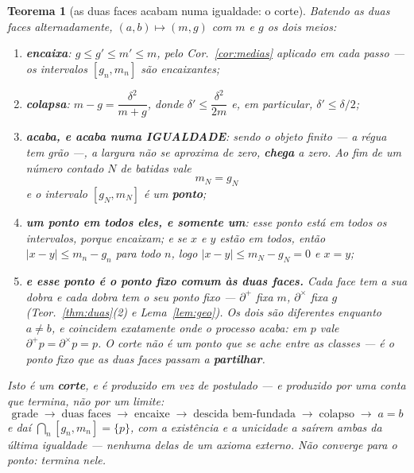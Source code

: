 \documentclass[11pt,a4paper]{article}
\newtheorem{teorema}{Teorema}
\begin{document}
\begin{teorema}[as duas faces acabam numa igualdade: o corte]\label{thm:corte}
Batendo as duas faces alternadamente, $(a,b)\mapsto(m,g)$ com $m$ e $g$ os dois
meios:
\begin{enumerate}\itemsep3pt
\item[(1)] \textbf{encaixa}: $g\le g'\le m'\le m$, pelo Cor.~\ref{cor:medias}
aplicado em cada passo --- os intervalos $[g_{n},m_{n}]$ são encaixantes;
\item[(2)] \textbf{colapsa}: $m-g=\dfrac{\delta^{2}}{m+g}$, donde
$\delta'\le\dfrac{\delta^{2}}{2m}$ e, em particular, $\delta'\le\delta/2$;
\item[(3)] \textbf{acaba, e acaba numa IGUALDADE}: sendo o objeto \emph{finito}
--- a régua tem grão ---, a largura não se aproxima de zero, \textbf{chega} a
zero. Ao fim de um número \emph{contado} $N$ de batidas vale
\[
\boxed{\;m_{N}=g_{N}\;}
\]
e o intervalo $[g_{N},m_{N}]$ é um \textbf{ponto};
\item[(4)] \textbf{um ponto em todos eles, e somente um}: esse ponto está em
todos os intervalos, porque encaixam; e se $x$ e $y$ estão em todos, então
$\lvert x-y\rvert\le m_{n}-g_{n}$ para todo $n$, logo
$\lvert x-y\rvert\le m_{N}-g_{N}=0$ e $x=y$;
\item[(5)] \textbf{e esse ponto é o ponto fixo comum às duas faces.} Cada face
tem a sua dobra e cada dobra tem o seu ponto fixo --- $\partial^{+}$ fixa $m$,
$\partial^{\times}$ fixa $g$ (Teor.~\ref{thm:duas}(2) e Lema~\ref{lem:geo}). Os
dois são \emph{diferentes} enquanto $a\neq b$, e coincidem exatamente onde o
processo acaba: em $p$ vale $\partial^{+}p=\partial^{\times}p=p$. O corte não é
um ponto que se ache \emph{entre} as classes --- é o ponto fixo que as duas
faces passam a \textbf{partilhar}.
\end{enumerate}
Isto é um \textbf{corte}, e é \emph{produzido} em vez de postulado --- e
produzido por uma conta que \emph{termina}, não por um limite:
\[
\boxed{\;\text{grade}\;\to\;\text{duas faces}\;\to\;\text{encaixe}\;\to\;
\text{descida bem-fundada}\;\to\;\text{colapso}\;\to\;a=b\;}
\]
e daí $\bigcap_{n}[g_{n},m_{n}]=\{p\}$, com a existência e a unicidade a saírem
\emph{ambas} da última igualdade --- nenhuma delas de um axioma externo.
\emph{Não converge para o ponto: termina nele.}
\end{teorema}
\end{document}

